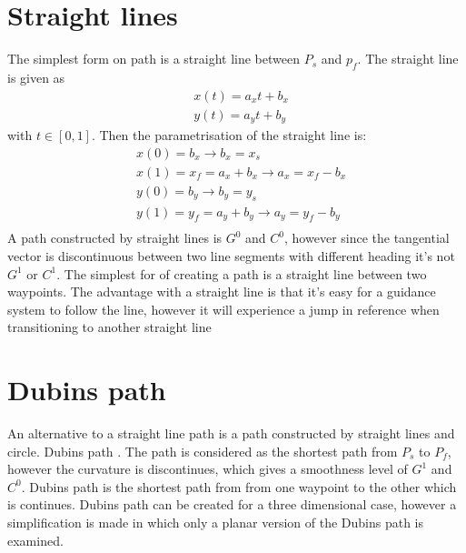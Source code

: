 \section{Straight lines}
The simplest form on path is a straight line between $P_s$ and $p_f$. The straight line is given as 
\begin{subequations}
\begin{align}
& x(t) = a_xt + b_x \\
& y(t) = a_yt + b_y 
\end{align}
\end{subequations}
with $ t \in [0,1] $. Then the parametrisation of the straight line is:
\begin{subequations}
\begin{align}
& x(0) = b_x \rightarrow b_x = x_s \\
& x(1) = x_f = a_x + b_x \rightarrow a_x = x_f - b_x \\
& y(0) = b_y \rightarrow b_y = y_s \\
& y(1) = y_f = a_y + b_y \rightarrow a_y = y_f - b_y \\
\end{align}
\end{subequations}
A path constructed by straight lines is $G^0$ and $C^0$, however since the tangential vector is discontinuous between two line segments with different heading it's not $G^1$ or $C^1$.
The simplest for of creating a path is a straight line between two waypoints. The advantage with a straight line is that it's easy for a guidance system to follow the line, however it will experience a jump in reference when transitioning to another straight line
\section{Dubins path}
An alternative to a straight line path is a path constructed by straight lines and circle. Dubins path \citep{dubins1957curves}. The path is considered as the shortest path from $P_s$ to $P_f$, however the curvature is discontinues, which gives a smoothness level of $G^1$ and $C^0$. 
Dubins path is the shortest path from from one waypoint to the other which is continues. Dubins path can be created for a three dimensional case, however a simplification is made in which only a planar version of the Dubins path is examined. 